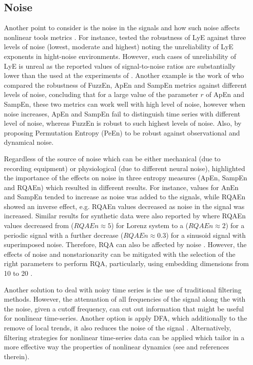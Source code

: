\subsection{Noise}
Another point to consider is the noise in the signals
and how such noise affects nonlinear tools metrics \citep{caballero2014}.
For instance, \cite{rosenstein1993} tested the robustness of LyE against 
three levels of noise (lowest, moderate and highest) noting the unreliability 
of LyE exponents in hight-noise environments.
However, such cases of unreliability of LyE is unreal as the reported 
values of signal-to-noise ratios are substantially lower than the used at 
the experiments of \cite{rosenstein1993}.
Another example is the work of \cite{chen2009} who compared the 
robustness of FuzzEn, ApEn and SampEn metrics against different levels of noise, 
concluding that for a large value of the parameter $r$ of ApEn and SampEn, 
these two metrics can work well with high level of noise, however
when noise increases, ApEn and SampEn fail to distinguish time series with 
different level of noise, whereas FuzzEn is robust to such highest 
levels of noise.
Also, \cite{bandt2002} by proposing Permutation Entropy (PeEn) to be
robust against observational and dynamical noise.

Regardless of the source of noise which can be either mechanical 
(due to recording equipment) or physiological (due to different neural noise), 
\cite{rhea2011} highlighted the importance of the effects on noise in three 
entropy measures (ApEn, SampEn and RQAEn) which resulted in different results.
For instance, values for AnEn and SampEn tended to increase as noise was 
added to the signals, while RQAEn  showed an inverse effect, e.g. RQAEn 
values decreased as noise in the signal was increased.
Similar results for synthetic data were also reported by \cite{pellecchia2005} 
where RQAEn values decreased from ($RQAEn \approx 5$) for Lorenz system to a 
($RQAEn \approx 2$) for a periodic signal with a further decrease 
($RQAEn \approx 0.3$) for a sinusoid signal with superimposed noise. 
Therefore, RQA can also be affected by noise \citep{rhea2011}.
However, the effects of noise and nonstarionarity
can be mitigated with the selection of the right parameters to perform RQA,
particularly, using embedding dimensions from 10 to 20 
\citep{webber2005}.

Another solution to deal with noisy time series is the use of 
traditional filtering methods. However, the attenuation of all frequencies 
of the signal along the with the noise, given a cutoff frequency, can cut 
out information that might be useful for nonlinear time-series. 
Another option is apply DFA, which additionally to the remove of local 
trends, it also reduces the noise of the signal \citep{hausdorff1995}.
Alternatively, filtering strategies for nonlinear time-series data can 
be applied which tailor in a more effective way the properties of 
nonlinear dynamics (see \citealt*{bradley2015} and references therein).


